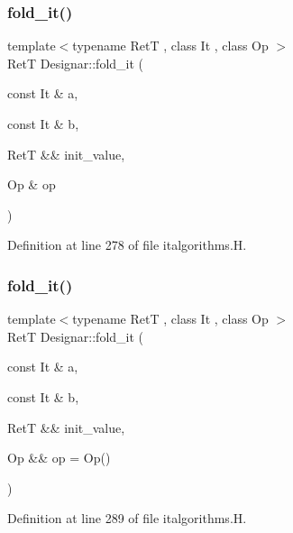 \subsubsection{\texorpdfstring{fold\+\_\+it()}{fold\_it()}\hspace{0.1cm}{\footnotesize\ttfamily [3/4]}}
{\footnotesize\ttfamily template$<$typename RetT , class It , class Op $>$ \\
RetT Designar\+::fold\+\_\+it (\begin{DoxyParamCaption}\item[{const It \&}]{a,  }\item[{const It \&}]{b,  }\item[{RetT \&\&}]{init\+\_\+value,  }\item[{Op \&}]{op }\end{DoxyParamCaption})}



Definition at line 278 of file italgorithms.\+H.

\mbox{\label{namespace_designar_a5d9fa528a06abdba905e1c46afc4ae22}} 
\subsubsection{\texorpdfstring{fold\+\_\+it()}{fold\_it()}\hspace{0.1cm}{\footnotesize\ttfamily [4/4]}}
{\footnotesize\ttfamily template$<$typename RetT , class It , class Op $>$ \\
RetT Designar\+::fold\+\_\+it (\begin{DoxyParamCaption}\item[{const It \&}]{a,  }\item[{const It \&}]{b,  }\item[{RetT \&\&}]{init\+\_\+value,  }\item[{Op \&\&}]{op = {\ttfamily Op()} }\end{DoxyParamCaption})}



Definition at line 289 of file italgorithms.\+H.

\mbox{\label{namespace_designar_a4e4d2731163735de1b313fbd6e888336}} 
